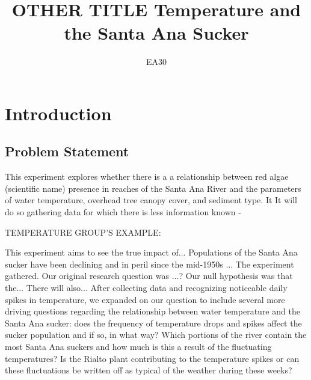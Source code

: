 \documentclass{article}\usepackage[]{graphicx}\usepackage[]{color}
\title{OTHER TITLE Temperature and the Santa Ana Sucker}
\author{EA30}
\begin{document}
\maketitle

\newpage
\tableofcontents
\newpage

\section{Introduction}


\subsection{Problem Statement}
This experiment explores whether there is a a relationship between red algae (scientific name) presence in reaches of the Santa Ana River
and the parameters of water temperature, overhead tree canopy cover, and sediment type. It It will do so gathering data for which there is less information known - 

TEMPERATURE GROUP'S EXAMPLE: 

This experiment aims to see the true impact of...  
Populations of the Santa Ana sucker have
been declining and in peril since the mid-1950s ... 
The experiment gathered. 
Our original research question was ...? 
Our null hypothesis was that the... There will also... 
After collecting data and recognizing noticeable
daily spikes in temperature, we expanded on our question to include several
more driving questions regarding the relationship between water temperature
and the Santa Ana sucker: does the frequency of temperature drops and spikes
affect the sucker population and if so, in what way? Which portions of the
river contain the most Santa Ana suckers and how much is this a result of the
fluctuating temperatures? Is the Rialto plant contributing to the temperature
spikes or can these fluctuations be written off as typical of the weather during
these weeks?
\end{document}
